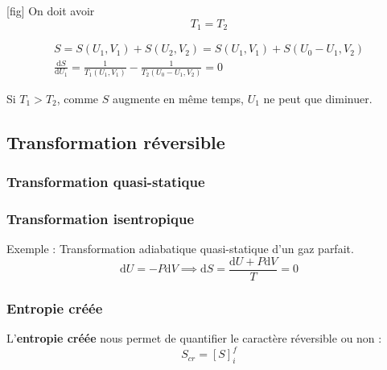 [fig]
On doit avoir  
\begin{equation}
  T_1 = T_2
\end{equation}

\begin{myproof}{}{}
\begin{gather}
  S = S(U_1, V_1) + S(U_2, V_2) = S(U_1, V_1) + S(U_0 - U_1, V_2) \\ 
  \frac{\mathrm{d}S}{\mathrm{d}U_1} = \frac{1}{T_1(U_1, V_1)} - \frac{1}{T_2(U_0-U_1, V_2)}  = 0
\end{gather}
\end{myproof}

Si $T_1>T_2$, comme $S$ augmente en même temps, $U_1$ ne peut que diminuer.




\subsection{Transformation réversible} %
\label{sub:Transformation réversible}

\subsubsection{Transformation quasi-statique} %
\label{sec:Transformation quasi-statique}


\subsubsection{Transformation isentropique} %
\label{sec:Transformation isentropique}

Exemple : Transformation adiabatique quasi-statique d'un gaz parfait. 
\begin{equation}
  \mathrm{d}U = - P \mathrm{d} V \implies \mathrm{d}S = \frac{\mathrm{d}U + P \mathrm{d}V}{T}  = 0 
\end{equation}

\subsubsection{Entropie créée} %
\label{sec:Entropie créée}

L'\textbf{entropie créée} nous permet de quantifier le caractère réversible ou non : 
\begin{equation}
  S _{cr} = [S] _{i} ^{f}
\end{equation}

